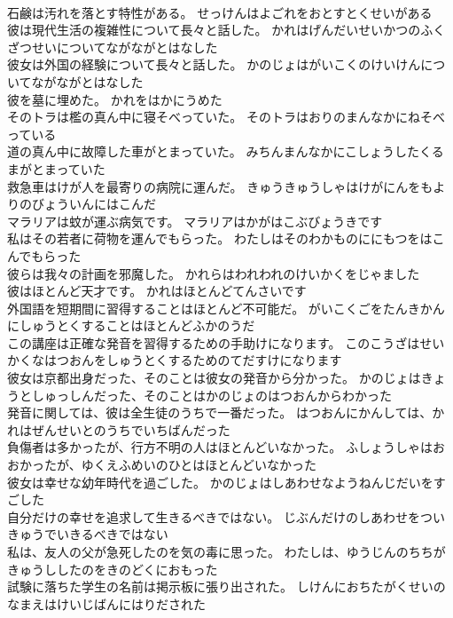 \documentclass[8pt]{extreport}
\begin{document}
\begin{CJK}{UTF8}{min}
\\	石鹸は汚れを落とす特性がある。	せっけんはよごれをおとすとくせいがある 
\\	彼は現代生活の複雑性について長々と話した。	かれはげんだいせいかつのふくざつせいについてながながとはなした 
\\	彼女は外国の経験について長々と話した。	かのじょはがいこくのけいけんについてながながとはなした 
\\	彼を墓に埋めた。	かれをはかにうめた 
\\	そのトラは檻の真ん中に寝そべっていた。	そのトラはおりのまんなかにねそべっている 
\\	道の真ん中に故障した車がとまっていた。	みちんまんなかにこしょうしたくるまがとまっていた 
\\	救急車はけが人を最寄りの病院に運んだ。	きゅうきゅうしゃはけがにんをもよりのびょういんにはこんだ 
\\	マラリアは蚊が運ぶ病気です。	マラリアはかがはこぶびょうきです 
\\	私はその若者に荷物を運んでもらった。	わたしはそのわかものににもつをはこんでもらった 
\\	彼らは我々の計画を邪魔した。	かれらはわれわれのけいかくをじゃました 
\\	彼はほとんど天才です。	かれはほとんどてんさいです 
\\	外国語を短期間に習得することはほとんど不可能だ。	がいこくごをたんきかんにしゅうとくすることはほとんどふかのうだ 
\\	この講座は正確な発音を習得するための手助けになります。	このこうざはせいかくなはつおんをしゅうとくするためのてだすけになります 
\\	彼女は京都出身だった、そのことは彼女の発音から分かった。	かのじょはきょうとしゅっしんだった、そのことはかのじょのはつおんからわかった 
\\	発音に関しては、彼は全生徒のうちで一番だった。	はつおんにかんしては、かれはぜんせいとのうちでいちばんだった 
\\	負傷者は多かったが、行方不明の人はほとんどいなかった。	ふしょうしゃはおおかったが、ゆくえふめいのひとはほとんどいなかった 
\\	彼女は幸せな幼年時代を過ごした。	かのじょはしあわせなようねんじだいをすごした 
\\	自分だけの幸せを追求して生きるべきではない。	じぶんだけのしあわせをついきゅうでいきるべきではない 
\\	私は、友人の父が急死したのを気の毒に思った。	わたしは、ゆうじんのちちがきゅうししたのをきのどくにおもった 
\\	試験に落ちた学生の名前は掲示板に張り出された。	しけんにおちたがくせいのなまえはけいじばんにはりだされた 

\end{CJK}
\end{document}
